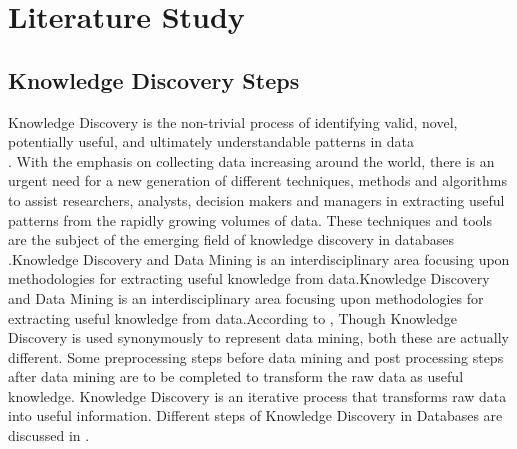 


\chapter{Literature Study} %

\label{Literature Study} %




\section{Knowledge Discovery Steps}
Knowledge Discovery is the non-trivial process of identifying valid, novel, potentially useful, and ultimately understandable patterns in data \\\cite{knowledge discovery}. With the emphasis on collecting data increasing around the world, there is an urgent need for a new generation of different techniques, methods and algorithms to assist researchers, analysts, decision makers and managers in extracting useful patterns from the rapidly growing volumes of data. These techniques and tools are the subject of the emerging field of knowledge discovery in databases .Knowledge Discovery and Data Mining  is an interdisciplinary area focusing upon methodologies for extracting useful knowledge from data.Knowledge Discovery and Data Mining is an interdisciplinary area focusing upon methodologies for extracting useful knowledge from data.According to \cite{IBM}, Though Knowledge Discovery is used synonymously to represent data mining, both these are actually different. Some preprocessing steps before data mining and post processing steps after data mining are to be completed to transform the raw data as useful knowledge. \newline
Knowledge Discovery is an iterative process that transforms raw data into useful information. Different steps of Knowledge Discovery in Databases are discussed in \cite{kddsteps}.

